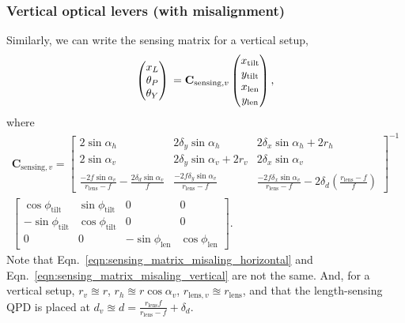 \subsubsection{Vertical optical levers (with misalignment)}
Similarly, we can write the sensing matrix for a vertical setup,
\begin{equation}
	\begin{pmatrix}
		x_L\\
		\theta_P\\
		\theta_Y
	\end{pmatrix}\\
	=
	\mathbf{C}_{\mathrm{sensing},v}
	\begin{pmatrix}
		x_\mathrm{tilt}\\
		y_\mathrm{tilt}\\
		x_\mathrm{len}\\
		y_\mathrm{len}
	\end{pmatrix},
\end{equation}
where
\begin{multline}
	\mathbf{C}_{\mathrm{sensing},v}=
	\begin{bmatrix}
		2\sin\alpha_h & 2\delta_y\sin\alpha_h & 2\delta_x\sin\alpha_h + 2r_h\\
		2\sin\alpha_v & 2\delta_y\sin\alpha_v + 2r_v & 2\delta_x\sin\alpha_v\\
		\frac{-2f\sin\alpha_v}{r_\mathrm{lens}-f} - \frac{2\delta_d\sin\alpha_v}{f} & \frac{-2f\delta_y\sin\alpha_v}{r_\mathrm{lens}-f} & \frac{-2f\delta_x\sin\alpha_v}{r_\mathrm{lens}-f} - 2\delta_d\left(\frac{r_\mathrm{lens}-f}{f}\right)
	\end{bmatrix}^{-1}\\
	\begin{bmatrix}
		\cos\phi_\mathrm{tilt} & \sin\phi_\mathrm{tilt} & 0 & 0\\
		-\sin\phi_\mathrm{tilt} & \cos\phi_\mathrm{tilt} & 0 & 0\\
		0 & 0 & -\sin\phi_\mathrm{len} & \cos\phi_\mathrm{len}
	\end{bmatrix}.
	\label{eqn:sensing_matrix_misaling_vertical}
\end{multline}
Note that Eqn.~\eqref{eqn:sensing_matrix_misaling_horizontal} and Eqn.~\eqref{eqn:sensing_matrix_misaling_vertical} are not the same.
And, for a vertical setup, $r_v\approxeq r$, $r_h\approxeq r\cos\alpha_v$, $r_{\mathrm{lens},v}\approxeq r_\mathrm{lens}$, and that the length-sensing QPD is placed at $d_v \approxeq d = \frac{r_\mathrm{lens}f}{r_\mathrm{lens}-f}+\delta_d$.

